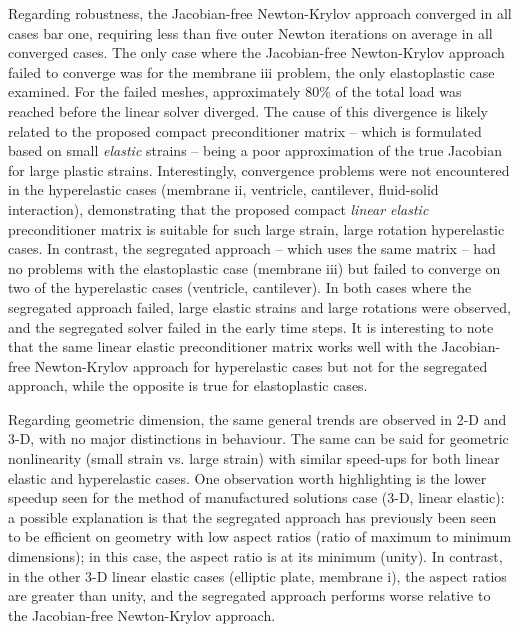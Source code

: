 \documentclass[sn-mathphys,Numbered]{sn-jnl}%
\begin{document}
Regarding robustness, the Jacobian-free Newton-Krylov approach converged in all cases bar one, requiring less than five outer Newton iterations on average in all converged cases.
The only case where the Jacobian-free Newton-Krylov approach failed to converge was for the membrane iii problem, the only elastoplastic case examined.
For the failed meshes, approximately 80\% of the total load was reached before the linear solver diverged.
The cause of this divergence is likely related to the proposed compact preconditioner matrix -- which is formulated based on small \emph{elastic} strains -- being a poor approximation of the true Jacobian for large plastic strains.
Interestingly, convergence problems were not encountered in the hyperelastic cases (membrane ii, ventricle, cantilever, fluid-solid interaction), demonstrating that the proposed compact \emph{linear elastic} preconditioner matrix is suitable for such large strain, large rotation hyperelastic cases.
In contrast, the segregated approach -- which uses the same matrix -- had no problems with the elastoplastic case (membrane iii) but failed to converge on two of the hyperelastic cases (ventricle, cantilever).
In both cases where the segregated approach failed, large elastic strains and large rotations were observed, and the segregated solver failed in the early time steps.
It is interesting to note that the same linear elastic preconditioner matrix works well with the Jacobian-free Newton-Krylov approach for hyperelastic cases but not for the segregated approach, while the opposite is true for elastoplastic cases.

Regarding geometric dimension, the same general trends are observed in 2-D and 3-D, with no major distinctions in behaviour.
The same can be said for geometric nonlinearity (small strain vs. large strain) with similar speed-ups for both linear elastic and hyperelastic cases.
One observation worth highlighting is the lower speedup seen for the method of manufactured solutions case (3-D, linear elastic): a possible explanation is that the segregated approach has previously been seen to be efficient on geometry with low aspect ratios (ratio of maximum to minimum dimensions);
in this case, the aspect ratio is at its minimum (unity).
In contrast, in the other 3-D linear elastic cases (elliptic plate, membrane i), the aspect ratios are greater than unity, and the segregated approach performs worse relative to the Jacobian-free Newton-Krylov approach. 
\end{document}
